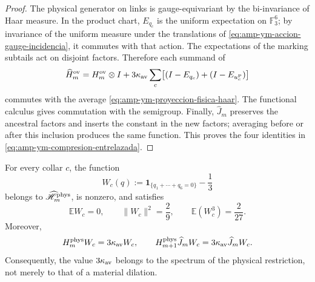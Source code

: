 \begin{proof}
The physical generator on links is gauge-equivariant by the
bi-invariance of Haar measure. In the product chart, \(E_{q_c}\) is the uniform
expectation on \(\mathbb F_3^6\); by invariance of the uniform measure under
the translations of \eqref{eq:amp-ym-accion-gauge-incidencia}, it commutes with
that action. The expectations of the marking subtails act on
disjoint factors. Therefore each summand of
\[
 \widehat H_m^{\rm ov}
 =H_m^{\rm ov}\otimes I
 +3\kappa_{\rm av}\sum_c
 \bigl[(I-E_{q_c})+(I-E_{u_c^{\rm P}})\bigr]
\]
commutes with the average \eqref{eq:amp-ym-proyeccion-fisica-haar}. The
functional calculus gives commutation with the semigroup. Finally,
\(\widehat J_m\) preserves the ancestral factors and inserts the constant
in the new factors; averaging before or after this inclusion produces
the same function. This proves the four identities in
\eqref{eq:amp-ym-compresion-entrelazada}.
\end{proof}

\begin{lemma}
\label{lem:amp-ym-testigo-fisico-q6}
For every collar \(c\), the function
\begin{equation}\label{eq:amp-ym-testigo-fisico-def}
 W_c(q)
 :=\mathbf 1_{\{q_1+\cdots+q_6=0\}}-\frac13
\end{equation}
belongs to \(\widehat{\mathscr H}_m^{\rm phys}\), is nonzero, and satisfies
\begin{equation}\label{eq:amp-ym-testigo-fisico-momentos}
 \mathbb E W_c=0,\qquad
 \|W_c\|^2=\frac29,\qquad
 \mathbb E(W_c^3)=\frac2{27}.
\end{equation}
Moreover,
\begin{equation}\label{eq:amp-ym-testigo-fisico-gap}
 H_m^{\rm phys}W_c=3\kappa_{\rm av}W_c,\qquad
 H_{m+1}^{\rm phys}\widehat J_mW_c
 =3\kappa_{\rm av}\widehat J_mW_c.
\end{equation}
Consequently, the value \(3\kappa_{\rm av}\) belongs to the spectrum of the
physical restriction, not merely to that of a material dilation.
\end{lemma}

